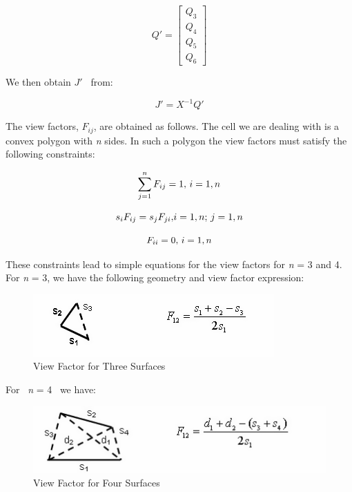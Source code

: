 \begin{equation}
Q' = \left[ \begin{array}{c}
    Q_3 \\
    Q_4 \\
    Q_5 \\
    Q_6 \end{array} \right]
\end{equation}

We then obtain \(J'\) ~from:

\begin{equation}
J' = {X^{ - 1}}Q'
\end{equation}

The view factors, \({F_{ij}}\), are obtained as follows. The cell we are dealing with is a convex polygon with \emph{n} sides. In such a polygon the view factors must satisfy the following constraints:

\begin{equation}
\sum\limits_{j = 1}^n {{F_{ij}} = 1{\rm{,  }}~i = 1,n}
\end{equation}

\begin{equation}
{s_i}{F_{ij}} = {s_j}{F_{ji}}{\rm{,  }}i = 1,n{\rm{;  }}~j = 1,n
\end{equation}

\begin{equation}
{F_{ii}} = 0{\rm{,  }}~i = 1,n
\end{equation}

These constraints lead to simple equations for the view factors for \emph{n} = 3 and 4. For \emph{n} = 3, we have the following geometry and view factor expression:

\begin{figure}[htbp]
\centering
\includegraphics{media/image1059.png}
\caption{View Factor for Three Surfaces}
\end{figure}

For~ \emph{n} = 4~ we have:

\begin{figure}[htbp]
\centering
\includegraphics{media/image1060.png}
\caption{View Factor for Four Surfaces}
\end{figure}

